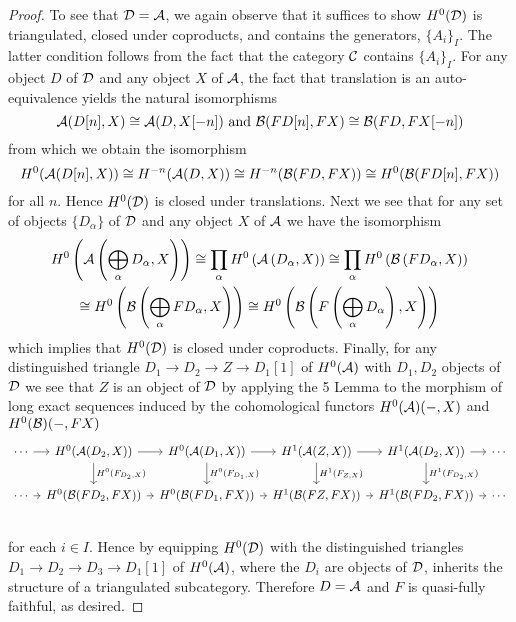 \begin{proof}
  To see that \(\mathcal{D} = \mathcal{A}\), we again observe that it suffices to show \(H^0(\mathcal{D})\) is triangulated, closed under coproducts, and contains the generators, \(\{A_i\}_I\).
  The latter condition follows from the fact that the category \(\mathcal{C}\) contains \(\{A_i\}_I\).
  For any object \(D\) of \(\mathcal{D}\) and any object \(X\) of \(\mathcal{A}\), the fact that translation is an auto-equivalence yields the natural isomorphisms
  \[\A(D[n], X) \cong \A(D, X[-n])\ \text{and}\ \B(FD[n], FX) \cong \B(FD, FX[-n])\]
  from which we obtain the isomorphism
  \[H^0(\mathcal{A}(D[n], X)) \cong H^{-n}(\mathcal{A}(D,X)) \cong H^{-n}(\mathcal{B}(FD, FX)) \cong H^0(\mathcal{B}(FD[n], FX))\]
  for all \(n\).
  Hence \(H^0(\mathcal{D})\) is closed under translations.
  Next we see that for any set of objects \(\{D_\alpha\}\) of \(\mathcal{D}\) and any object \(X\) of \(\mathcal{A}\) we have the isomorphism
  \begin{gather*}
    H^0\left(\mathcal{A}\left(\bigoplus_\alpha D_\alpha, X\right)\right)
  \cong \prod_\alpha H^0\left(\mathcal{A}\left(D_\alpha, X\right)\right)
    \cong \prod_\alpha H^0\left(\mathcal{B}\left(FD_\alpha, X\right)\right)\\
    \cong H^0\left(\mathcal{B}\left(\bigoplus_\alpha FD_\alpha, X\right)\right)
    \cong H^0\left(\mathcal{B}\left(F\left(\bigoplus_\alpha D_\alpha\right), X\right)\right)
  \end{gather*}
  which implies that \(H^0(\mathcal{D})\) is closed under coproducts.
  Finally, for any distinguished triangle \(D_1 \to D_2 \to Z \to D_1[1]\) of \(H^0(\mathcal{A})\) with \(D_1, D_2\) objects of \(\mathcal{D}\) we see that \(Z\) is an object of \(\mathcal{D}\) by applying the 5 Lemma to the morphism of long exact sequences induced by the cohomological functors \(H^0(\mathcal{A})(-, X)\) and \(H^0(\mathcal{B})(-, FX)\)
  \[\begin{tikzcd}[column sep=tiny]
  \cdots \arrow{r} & H^0(\A(D_2, X)) \arrow{r}\arrow{d}{H^0(F_{D_2,X})} & H^0(\A(D_1, X)) \arrow{r}\arrow{d}{H^0(F_{D_1,X})} & H^1(\A(Z, X)) \arrow{r}\arrow{d}{H^1(F_{Z,X})} & H^1(\A(D_2, X)) \arrow{r}\arrow{d}{H^1(F_{D_2,X})} & \cdots\\
  \cdots \arrow{r} & H^0(\B(FD_2, FX)) \arrow{r} & H^0(\B(FD_1, FX)) \arrow{r} & H^1(\B(FZ, FX)) \arrow{r} & H^1(\B(FD_2, FX)) \arrow{r}& \cdots\\
  \end{tikzcd}\]
  for each \(i \in I\).
  Hence by equipping \(H^0(\mathcal{D})\) with the distinguished triangles \(D_1 \to D_2 \to D_3 \to D_1[1]\) of \(H^0(\mathcal{A})\), where the \(D_i\) are objects of \(\mathcal{D}\), inherits the structure of a triangulated subcategory.
  Therefore \(D = \mathcal{A}\) and \(F\) is quasi-fully faithful, as desired.
\end{proof}

